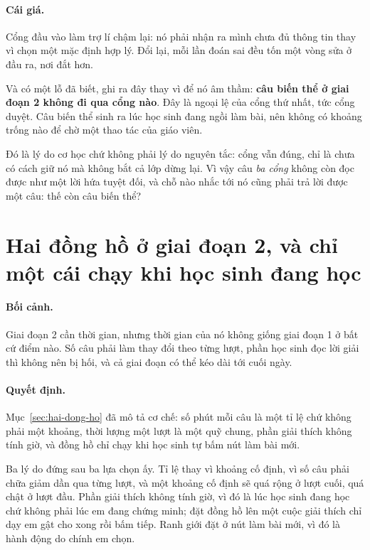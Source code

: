 \paragraph{Cái giá.} Cổng đầu vào làm trợ lí chậm lại: nó phải nhận ra mình chưa đủ thông tin
thay vì chọn một mặc định hợp lý. Đổi lại, mỗi lần đoán sai đều tốn một vòng sửa ở đầu ra, nơi
đắt hơn.

Và có một lỗ đã biết, ghi ra đây thay vì để nó âm thầm: \textbf{câu biến thể ở giai đoạn 2 không
đi qua cổng nào}. Đây là ngoại lệ của cổng thứ nhất, tức cổng duyệt. Câu biến thể sinh ra lúc học
sinh đang ngồi làm bài, nên không có khoảng trống nào để chờ một thao tác của giáo viên.

Đó là lý do cơ học chứ không phải lý do nguyên tắc: cổng vẫn đúng, chỉ là chưa có cách giữ nó mà
không bắt cả lớp dừng lại. Vì vậy câu \emph{ba cổng} không còn đọc được như một lời hứa tuyệt
đối, và chỗ nào nhắc tới nó cũng phải trả lời được một câu: thế còn câu biến thể?

\section{Hai đồng hồ ở giai đoạn 2, và chỉ một cái chạy khi học sinh đang học}

\paragraph{Bối cảnh.} Giai đoạn 2 cần thời gian, nhưng thời gian của nó không giống giai đoạn 1 ở
bất cứ điểm nào. Số câu phải làm thay đổi theo từng lượt, phần học sinh đọc lời giải thì không
nên bị hối, và cả giai đoạn có thể kéo dài tới cuối ngày.

\paragraph{Quyết định.} Mục~\ref{sec:hai-dong-ho} đã mô tả cơ chế: số phút mỗi câu là một tỉ lệ
chứ không phải một khoảng, thời lượng một lượt là một quỹ chung, phần giải thích không tính giờ,
và đồng hồ chỉ chạy khi học sinh tự bấm nút làm bài mới.

Ba lý do đứng sau ba lựa chọn ấy. Tỉ lệ thay vì khoảng cố định, vì số câu phải chữa giảm dần qua
từng lượt, và một khoảng cố định sẽ quá rộng ở lượt cuối, quá chật ở lượt đầu. Phần giải thích
không tính giờ, vì đó là lúc học sinh đang học chứ không phải lúc em đang chứng minh; đặt đồng hồ
lên một cuộc giải thích chỉ dạy em gật cho xong rồi bấm tiếp. Ranh giới đặt ở nút làm bài mới, vì
đó là hành động do chính em chọn.

